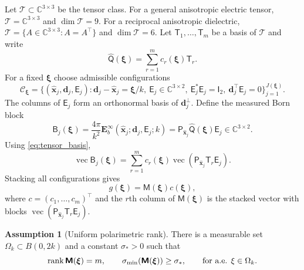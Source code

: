 \documentclass[11pt]{article}
\numberwithin{equation}{section}
\newcommand{\C}{\mathbb{C}}
\newcommand{\rank}{\operatorname{rank}}
\newcommand{\vect}[1]{\bm{#1}}
\newcommand{\tens}[1]{\bm{\mathsf{#1}}}
\newcommand{\vecop}{\ensuremath{\operatorname{vec}}}
\newcommand{\Qt}{\ensuremath{\tens{Q}}}
\newcommand{\Tt}{\ensuremath{\tens{T}}}
\newcommand{\Mt}{\ensuremath{\tens{M}}}
\newcommand{\Bt}{\ensuremath{\tens{B}}}
\theoremstyle{plain}
\theoremstyle{definition}
\newtheorem{assumption}[theorem]{Assumption}
\begin{document}
Let $\mathcal T\subset\C^{3\times3}$ be the tensor class.  For a general anisotropic electric tensor, $\mathcal T=\C^{3\times3}$ and $\dim\mathcal T=9$.  For a reciprocal anisotropic dielectric, $\mathcal T=\{A\in\C^{3\times3}:A=A^\top\}$ and $\dim\mathcal T=6$.  Let $\Tt_1,\ldots,\Tt_m$ be a basis of $\mathcal T$ and write
\begin{equation}\label{eq:tensor_basis}
  \widehat{\Qt}(\vect{\xi})=\sum_{r=1}^m c_r(\vect{\xi})\Tt_r.
\end{equation}
For a fixed $\vect{\xi}$ choose admissible configurations
\begin{equation*}
  \mathcal C_{\vect{\xi}}=\{(\hat{\vect{x}}_j,\vect{d}_j,\tens{E}_j): \vect{d}_j-\hat{\vect{x}}_j=\vect{\xi}/k,
  \ \tens{E}_j\in\C^{3\times2},\ \tens{E}_j^*\tens{E}_j=\tens{I}_2,\ \vect{d}_j^\top \tens{E}_j=0\}_{j=1}^{J(\vect{\xi})}.
\end{equation*}
The columns of $\tens{E}_j$ form an orthonormal basis of $\vect{d}_j^\perp$.  Define the measured Born block
\begin{equation*}
  \Bt_j(\vect{\xi})=\frac{4\pi}{k^2}\vect{E}_b^\infty(\hat{\vect{x}}_j;\vect{d}_j,\tens{E}_j;k)
  =\tens{P}_{\hat{\vect{x}}_j}\widehat{\Qt}(\vect{\xi})\tens{E}_j\in\C^{3\times2}.
\end{equation*}
Using \eqref{eq:tensor_basis},
\begin{equation*}
  \vecop \Bt_j(\vect{\xi})=\sum_{r=1}^m c_r(\vect{\xi})\vecop(\tens{P}_{\hat{\vect{x}}_j}\Tt_r\tens{E}_j).
\end{equation*}
Stacking all configurations gives
\begin{equation*}
  g(\vect{\xi})=\Mt(\vect{\xi})c(\vect{\xi}),
\end{equation*}
where $c=(c_1,\ldots,c_m)^\top$ and the $r$th column of $\Mt(\vect{\xi})$ is the stacked vector with blocks $\vecop(\tens{P}_{\hat{\vect{x}}_j}\Tt_r\tens{E}_j)$.

\begin{assumption}[Uniform polarimetric rank]\label{ass:rank}
There is a measurable set $\Omega_k\subset B(0,2k)$ and a constant $\sigma_*>0$ such that
\begin{equation*}
  \rank \Mt(\vect{\xi})=m,
  \qquad
  \sigma_{\min}(\Mt(\vect{\xi}))\ge \sigma_*,
  \qquad \hbox{for a.e. }\xi\in\Omega_k .
\end{equation*}
\end{assumption}
\end{document}
